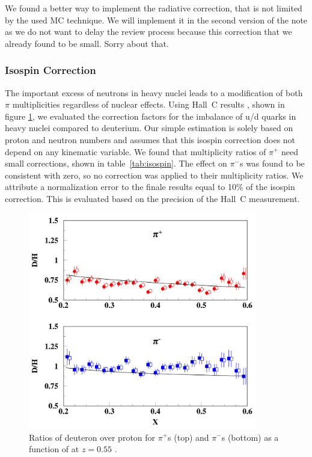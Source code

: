 {\color{red} We found a better way to implement the radiative correction,
that is not limited by the used MC technique. We will implement it in
the second version of the note as we do not want to delay the review process because this correction that we already found to be small. Sorry about that.}

\subsubsection{Isospin Correction}

The important excess of neutrons in heavy nuclei leads to a modification of 
both $\pi$ multiplicities regardless of nuclear effects. Using Hall~C results 
\cite{Asaturyan:2011mq}, shown in figure \ref{fig:IsoSpin}, we evaluated the 
correction factors for the imbalance of u/d quarks in heavy nuclei compared
to deuterium. Our simple estimation is solely based on proton and neutron 
numbers and assumes that this isospin correction does not depend on any
kinematic variable. We found that multiplicity ratios of $\pi^+$ need small
corrections, shown in table~\ref{tab:isospin}. The effect on $\pi^-$s was 
found to be consistent with zero, so no correction was applied to their 
multiplicity ratios. We attribute a normalization error to the finale results
equal to 10\% of the isospin correction. This is evaluated based on the 
precision of the Hall~C measurement.

\begin{figure}[tbp]
\centering
\includegraphics[width=10cm] {chap5-fig/HallC-Isospin.png}
\caption {Ratios of deuteron over proton for $\pi^+$s (top) and $\pi^-$s (bottom)
as a function of \xb at $z=0.55$ \cite{Asaturyan:2011mq}.}
\label{fig:IsoSpin}
\end{figure}

